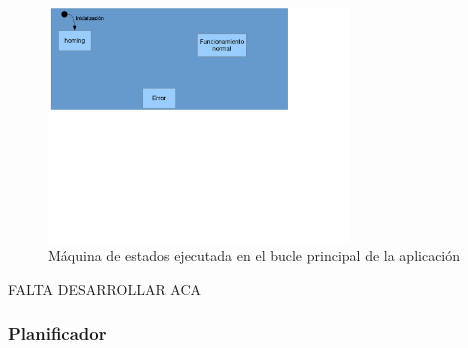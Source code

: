 \begin{figure}[!ht]
	\centering
	\includegraphics[width=8cm,scale=1]{resources/3_31-mefBuclePrincipal.png}
	\caption{Máquina de estados ejecutada en el bucle principal de la aplicación}
	\label{fig:\thefigure}
\end{figure}

\textcolor{FIXME}{FALTA DESARROLLAR ACA}


\subsubsection{Planificador}



